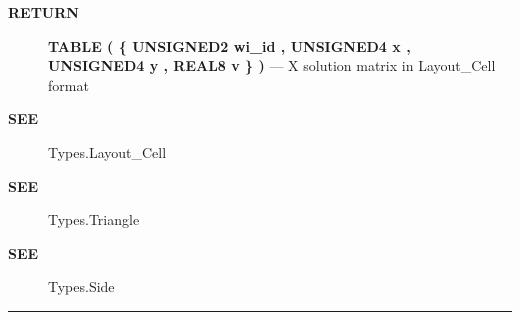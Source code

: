 \par
\begin{description}
\item [\colorbox{tagtype}{\color{white} \textbf{\textsf{RETURN}}}] \textbf{TABLE ( \{ UNSIGNED2 wi\_id , UNSIGNED4 x , UNSIGNED4 y , REAL8 v \} )} --- X solution matrix in Layout\_Cell format
\end{description}






\par
\begin{description}
\item [\colorbox{tagtype}{\color{white} \textbf{\textsf{SEE}}}] Types.Layout\_Cell
\item [\colorbox{tagtype}{\color{white} \textbf{\textsf{SEE}}}] Types.Triangle
\item [\colorbox{tagtype}{\color{white} \textbf{\textsf{SEE}}}] Types.Side
\end{description}




\rule{\linewidth}{0.5pt}
